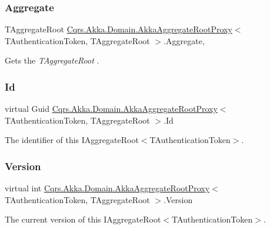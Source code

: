 \subsubsection{\texorpdfstring{Aggregate}{Aggregate}}
{\footnotesize\ttfamily T\+Aggregate\+Root \hyperlink{classCqrs_1_1Akka_1_1Domain_1_1AkkaAggregateRootProxy}{Cqrs.\+Akka.\+Domain.\+Akka\+Aggregate\+Root\+Proxy}$<$ T\+Authentication\+Token, T\+Aggregate\+Root $>$.Aggregate\hspace{0.3cm}{\ttfamily [get]}, {}}



Gets the {\itshape T\+Aggregate\+Root} . 

\mbox{\label{classCqrs_1_1Akka_1_1Domain_1_1AkkaAggregateRootProxy_a7854104312b6088a2c604b334433b633_a7854104312b6088a2c604b334433b633}} 
\subsubsection{\texorpdfstring{Id}{Id}}
{\footnotesize\ttfamily virtual Guid \hyperlink{classCqrs_1_1Akka_1_1Domain_1_1AkkaAggregateRootProxy}{Cqrs.\+Akka.\+Domain.\+Akka\+Aggregate\+Root\+Proxy}$<$ T\+Authentication\+Token, T\+Aggregate\+Root $>$.Id\hspace{0.3cm}{\ttfamily [get]}}



The identifier of this I\+Aggregate\+Root$<$\+T\+Authentication\+Token$>$. 

\mbox{\label{classCqrs_1_1Akka_1_1Domain_1_1AkkaAggregateRootProxy_a24ff2ddef0d416ac5b936c1887ac2154_a24ff2ddef0d416ac5b936c1887ac2154}} 
\subsubsection{\texorpdfstring{Version}{Version}}
{\footnotesize\ttfamily virtual int \hyperlink{classCqrs_1_1Akka_1_1Domain_1_1AkkaAggregateRootProxy}{Cqrs.\+Akka.\+Domain.\+Akka\+Aggregate\+Root\+Proxy}$<$ T\+Authentication\+Token, T\+Aggregate\+Root $>$.Version\hspace{0.3cm}{\ttfamily [get]}}



The current version of this I\+Aggregate\+Root$<$\+T\+Authentication\+Token$>$. 

